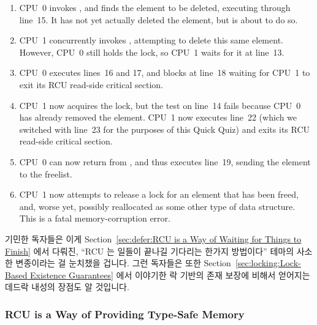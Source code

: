 {\begin{enumerate}
	\item	CPU~0 invokes , and finds the element
		to be deleted, executing through line~15.
		It has not yet actually deleted the element, but
		is about to do so.
	\item	CPU~1 concurrently invokes , attempting
		to delete this same element.
		However, CPU~0 still holds the lock, so CPU~1 waits
		for it at line~13.
	\item	CPU~0 executes lines~16 and 17, and blocks at
		line~18 waiting for CPU~1 to exit its RCU read-side
		critical section.
	\item	CPU~1 now acquires the lock, but the test on line~14
		fails because CPU~0 has already removed the element.
		CPU~1 now executes line~22 (which we switched with line~23
		for the purposes of this Quick Quiz)
		and exits its RCU read-side critical section.
	\item	CPU~0 can now return from ,
		and thus executes line~19, sending the element to
		the freelist.
	\item	CPU~1 now attempts to release a lock for an element
		that has been freed, and, worse yet, possibly
		reallocated as some other type of data structure.
		This is a fatal memory-corruption error.
	\fi
	\end{enumerate}
} \QuickQuizEnd

기민한 독자들은 이게
Section~\ref{sec:defer:RCU is a Way of Waiting for Things to Finish} 에서
다뤄진, ``RCU 는 일들이 끝나길 기다리는 한가지 방법이다'' 테마의 사소한
변종이라는 걸 눈치챘을 겁니다.
그런 독자들은 또한
Section~\ref{sec:locking:Lock-Based Existence Guarantees} 에서 이야기한 락
기반의 존재 보장에 비해서 얻어지는 데드락 내성의 장점도 알 것입니다.

\subsubsection{RCU is a Way of Providing Type-Safe Memory}
\label{sec:defer:RCU is a Way of Providing Type-Safe Memory}

